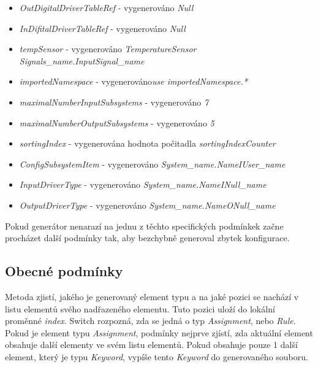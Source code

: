 \begin{itemize}
	\item \textit{OutDigitalDriverTableRef} - vygenerováno \textit{Null}
	\item \textit{InDifitalDriverTableRef} - vygenerováno \textit{Null}
	\item \textit{tempSensor} - vygenerováno \textit{TemperatureSensor\\ Signals\_name.InputSignal\_name}
	\item \textit{importedNamespace} - vygenerováno\textit{use importedNamespace.*}
	\item \textit{maximalNumberInputSubsystems} - vygenerováno \textit{7}
	\item \textit{maximalNumberOutputSubsystems} - vygenerováno \textit{5}
	\item \textit{sortingIndex} - vygenerována hodnota počitadla \textit{sortingIndexCounter}
	\item \textit{ConfigSubsystemItem} - vygenerováno \textit{System\_name.NameIUser\_name}
	\item \textit{InputDriverType} - vygenerováno \textit{System\_name.NameINull\_name}
	\item \textit{OutputDriverType} - vygenerováno \textit{System\_name.NameONull\_name}
\end{itemize}
 
Pokud generátor nenarazí na jednu z těchto specifických podmínkek začne procházet další podmínky tak, aby bezchybně generoval zbytek konfigurace.

\subsection{Obecné podmínky}

Metoda zjistí, jakého je generovaný element typu a na jaké pozici se nachází v listu elementů svého nadřazeného elementu. Tuto pozici uloží do lokální proměnné \textit{index}. Switch rozpozná, zda se jedná o typ \textit{Assignment}, nebo \textit{Rule}. Pokud je element typu \textit{Assignment}, podmínky nejprve zjístí, zda aktuální element obsahuje další elementy ve svém listu elementů. Pokud obsahuje pouze 1 další element, který je typu \textit{Keyword}, vypíše tento \textit{Keyword} do generovaného souboru.

